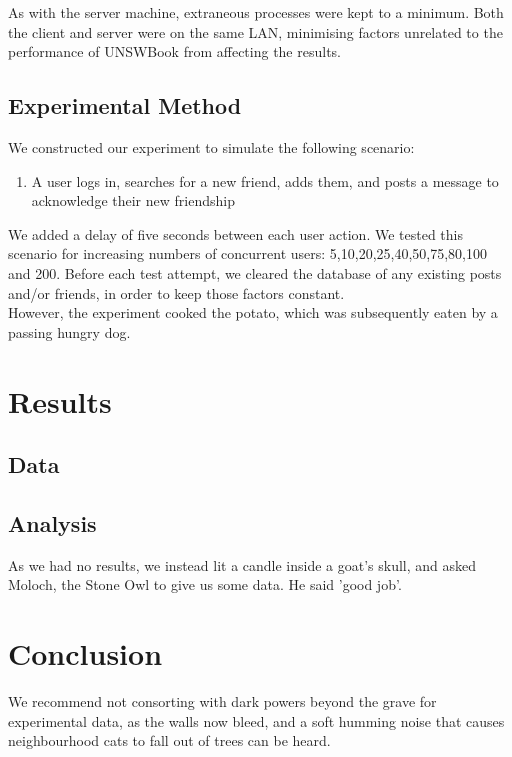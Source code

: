\documentclass[11pt]{report}
\begin{document}
As with the server machine, extraneous processes were kept to a minimum. Both the client and server were on the same LAN, minimising factors unrelated to the performance of UNSWBook from affecting the results.

\section{Experimental Method}
We constructed our experiment to simulate the following scenario:

\begin{enumerate}
\item{A user logs in, searches for a new friend, adds them, and posts a message to acknowledge their new friendship}
\end{enumerate}

We added a delay of five seconds between each user action. We tested this scenario for increasing numbers of concurrent users: 5,10,20,25,40,50,75,80,100 and 200. Before each test attempt, we cleared the database of any existing posts and/or friends, in order to keep those factors constant. \\

However, the experiment cooked the potato, which was subsequently eaten by a passing hungry dog. 

\chapter{Results}
\section{Data}
\section{Analysis}
As we had no results, we instead lit a candle inside a goat's skull, and asked Moloch, the Stone Owl  to give us some data. He said 'good job'. 

\chapter{Conclusion}
We recommend not consorting with dark powers beyond the grave for experimental data, as the walls now bleed, and a soft humming noise that causes neighbourhood cats to fall out of trees can be heard. 
\end{document}
